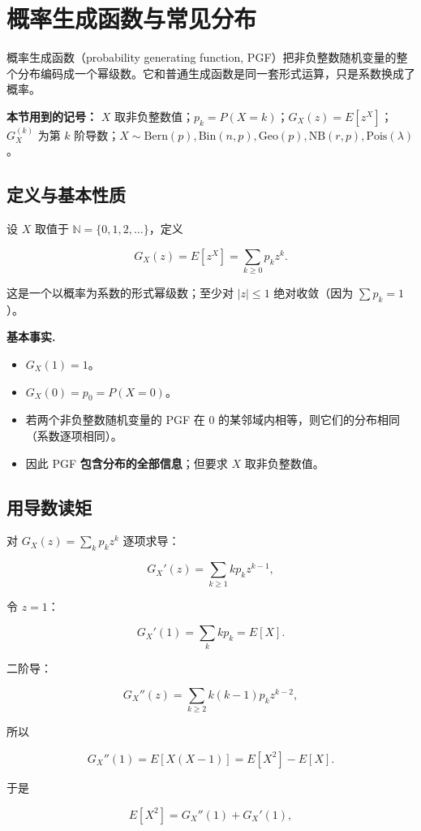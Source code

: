 \section{概率生成函数与常见分布}


概率生成函数（probability generating function, PGF）把非负整数随机变量的整个分布编码成一个幂级数。它和普通生成函数是同一套形式运算，只是系数换成了概率。

\textbf{本节用到的记号：} $X$ 取非负整数值；$p_k=P(X=k)$；$G_X(z)=E[z^X]$；$G_X^{(k)}$ 为第 $k$ 阶导数；$X\sim\mathrm{Bern}(p),\mathrm{Bin}(n,p),\mathrm{Geo}(p),\mathrm{NB}(r,p),\mathrm{Pois}(\lambda)$。

\subsection{定义与基本性质}


设 $X$ 取值于 $\mathbb N=\{0,1,2,\dots\}$，定义

\[
G_X(z)=E[z^X]=\sum_{k\ge0}p_kz^k.
\]

这是一个以概率为系数的形式幂级数；至少对 $|z|\le1$ 绝对收敛（因为 $\sum p_k=1$）。

\textbf{基本事实.}

\begin{itemize}
\item $G_X(1)=1$。
\item $G_X(0)=p_0=P(X=0)$。
\item 若两个非负整数随机变量的 PGF 在 $0$ 的某邻域内相等，则它们的分布相同（系数逐项相同）。
\item 因此 PGF \textbf{包含分布的全部信息}；但要求 $X$ 取非负整数值。
\end{itemize}


\subsection{用导数读矩}


对 $G_X(z)=\sum_k p_kz^k$ 逐项求导：

\[
G_X'(z)=\sum_{k\ge1}k p_kz^{k-1},
\]

令 $z=1$：

\[
G_X'(1)=\sum_k k p_k=E[X].
\]

二阶导：

\[
G_X''(z)=\sum_{k\ge2}k(k-1)p_kz^{k-2},
\]

所以

\[
G_X''(1)=E[X(X-1)]=E[X^2]-E[X].
\]

于是

\[
E[X^2]=G_X''(1)+G_X'(1),
\]

